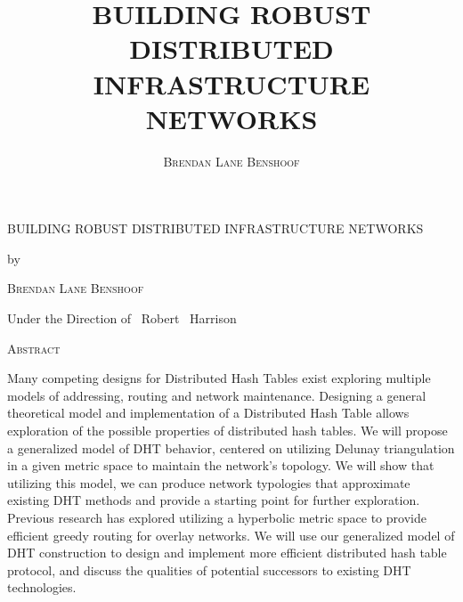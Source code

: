\documentclass[12pt,letterpaper]{report}
\title{\textsc{BUILDING ROBUST DISTRIBUTED INFRASTRUCTURE NETWORKS}}
\author{\textsc{Brendan Lane Benshoof}}
\date{}
\begin{document}
	

	
	\begin{center}
		{\scshape BUILDING ROBUST DISTRIBUTED INFRASTRUCTURE NETWORKS\par}
		\vspace{0.5cm}
		{by\par}
		\vspace{0.5cm}
		{\scshape Brendan Lane Benshoof\par}
		\vspace{0.5cm}
		{Under the Direction of ~Robert ~Harrison \par}
		\vspace{0.5cm}
		{\scshape Abstract \par}
		
	\end{center}
	
	Many competing designs for Distributed Hash Tables exist exploring multiple models of addressing, routing and network maintenance. 
Designing a general theoretical model and implementation of a Distributed Hash Table allows exploration of the possible properties of distributed hash tables. We will propose a generalized model of DHT behavior, centered on utilizing Delunay triangulation in a given metric space to maintain the network’s topology. We will show that utilizing this model, we can produce network typologies that approximate existing DHT methods and provide a starting point for further exploration.
Previous research has explored utilizing a hyperbolic metric space to provide efficient greedy routing for overlay networks. We will use our generalized model of DHT construction to design and implement more efficient distributed hash table protocol, and discuss the qualities of potential successors to existing DHT technologies.
	
	\vfill
	
	

	
	
\end{document}
